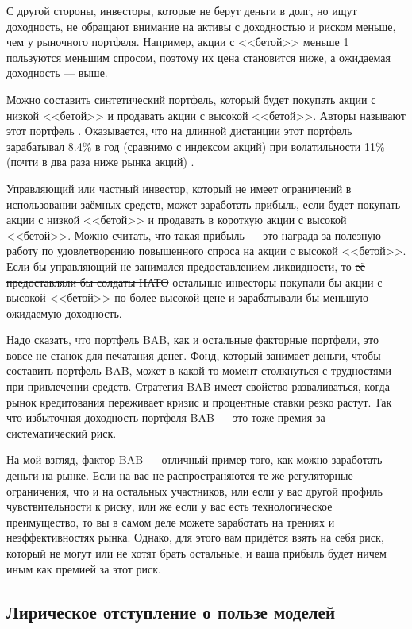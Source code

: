 С другой стороны, инвесторы, которые не берут деньги в долг, но ищут 
доходность, не обращают внимание на активы с доходностью и риском меньше, чем у 
рыночного портфеля. Например, акции с <<бетой>> меньше 1 пользуются меньшим 
спросом, поэтому их цена становится ниже, а ожидаемая доходность --- выше.

Можно составить синтетический портфель, который будет покупать акции с низкой 
<<бетой>> и продавать акции с высокой <<бетой>>. Авторы называют этот портфель
. Оказывается, что на 
длинной дистанции этот портфель зарабатывал 8.4\% в год (сравнимо с индексом 
акций) при волатильности 11\% (почти в два раза ниже рынка акций)
\cite{frazzini2014betting}.

Управляющий или частный инвестор, который не имеет ограничений в использовании 
заёмных средств, может заработать прибыль, если будет покупать акции с низкой 
<<бетой>> и продавать в короткую акции с высокой <<бетой>>. Можно считать, что 
такая прибыль --- это награда за полезную работу по удовлетворению повышенного 
спроса на акции с высокой <<бетой>>. Если бы управляющий не занимался 
предоставлением ликвидности, то \sout{её предоставляли бы солдаты НАТО} 
остальные инвесторы покупали бы акции с высокой <<бетой>> по более высокой цене 
и зарабатывали бы меньшую ожидаемую доходность.

Надо сказать, что портфель BAB, как и остальные факторные портфели, это вовсе 
не станок для печатания денег. Фонд, который занимает деньги, чтобы составить 
портфель BAB, может в какой-то момент столкнуться с трудностями при привлечении
средств. Стратегия BAB имеет свойство разваливаться, когда рынок кредитования
переживает кризис и процентные ставки резко растут. Так что избыточная 
доходность портфеля BAB --- это тоже премия за систематический риск.

На мой взгляд, фактор BAB --- отличный пример того, как можно заработать деньги 
на рынке. Если на вас не распространяются те же регуляторные ограничения, что и
на остальных участников, или если у вас другой профиль чувствительности к
риску, или же если у вас есть технологическое преимущество, то вы в самом деле 
можете заработать на трениях и неэффективностях рынка. Однако, для этого вам
придётся взять на себя риск, который не могут или не хотят брать остальные, и 
ваша прибыль будет ничем иным как премией за этот риск.

\subsection{Лирическое отступление о пользе моделей}

